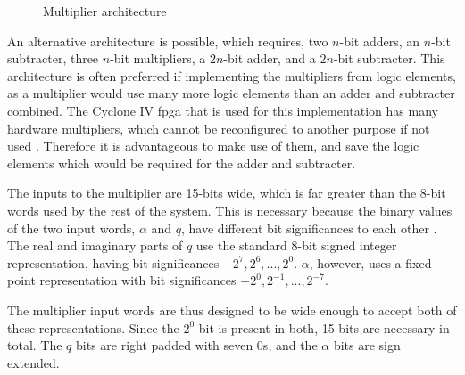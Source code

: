 \begin{figure}[ht]
	\caption{Multiplier architecture}
	\label{fig:mult-arch}
\end{figure}


An alternative architecture is possible, which requires, two $n$-bit adders, an $n$-bit subtracter, three $n$-bit multipliers, a $2n$-bit adder, and a $2n$-bit subtracter. This architecture is often preferred if implementing the multipliers from logic elements, as a multiplier would use many more logic elements than an adder and subtracter combined. The Cyclone IV \gls{fpga} that is used for this implementation has many hardware multipliers, which cannot be reconfigured to another purpose if not used \cite[p.4-1]{altera2016}. Therefore it is advantageous to make use of them, and save the logic elements which would be required for the adder and subtracter.

The inputs to the multiplier are 15-bits wide, which is far greater than the 8-bit words used by the rest of the system. This is necessary because the binary values of the two input words, $\alpha$ and $q$, have different bit significances to each other \cite{kazmierski2017}. The real and imaginary parts of $q$ use the standard 8-bit signed integer representation, having bit significances $-2^7,2^6,...,2^0$. $\alpha$, however, uses a fixed point representation with bit significances $-2^0,2^{-1},...,2^{-7}$.

The multiplier input words are thus designed to be wide enough to accept both of these representations. Since the $2^0$ bit is present in both, 15 bits are necessary in total. The $q$ bits are right padded with seven 0s, and the $\alpha$ bits are sign extended.


